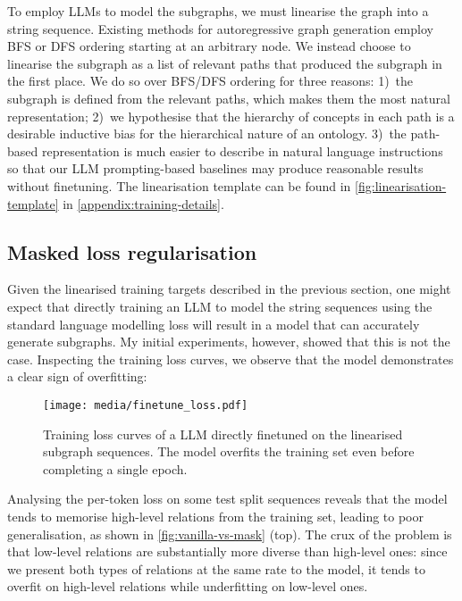To employ LLMs to model the subgraphs, we must linearise the graph into a string sequence. Existing methods for autoregressive graph generation employ BFS \cite{you2018graphrnn} or DFS \cite{goyal2020graphgen} ordering starting at an arbitrary node. We instead choose to linearise the subgraph as a list of relevant paths that produced the subgraph in the first place. We do so over BFS/DFS ordering for three reasons: 1)~the subgraph is defined from the relevant paths, which makes them the most natural representation; 2)~we hypothesise that the hierarchy of concepts in each path is a desirable inductive bias for the hierarchical nature of an ontology. 3)~the path-based representation is much easier to describe in natural language instructions so that our LLM prompting-based baselines may produce reasonable results without finetuning. The linearisation template can be found in \cref{fig:linearisation-template} in \cref{appendix:training-details}.

\subsection{Masked loss regularisation}



Given the linearised training targets described in the previous section, one might expect that directly training an LLM to model the string sequences using the standard language modelling loss will result in a model that can accurately generate subgraphs. My initial experiments, however, showed that this is not the case. Inspecting the training loss curves, we observe that the model demonstrates a clear sign of overfitting:
\begin{figure}[H]
    \centering
    \texttt{[image: media/finetune\_loss.pdf]}
    \captionsetup{width=0.6\linewidth}
    \caption{Training loss curves of a LLM directly finetuned on the linearised subgraph sequences. The model overfits the training set even before completing a single epoch.}
\end{figure}
Analysing the per-token loss on some test split sequences reveals that the model tends to memorise high-level relations from the training set, leading to poor generalisation, as shown in \cref{fig:vanilla-vs-mask} (top). The crux of the problem is that low-level relations are substantially more diverse than high-level ones: since we present both types of relations at the same rate to the model, it tends to overfit on high-level relations while underfitting on low-level ones.

